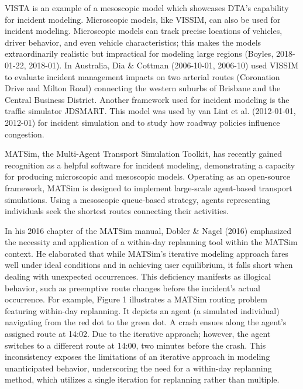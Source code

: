 \documentclass[fancy, oneside, mastersfancy, ms]{byuthesis}
\begin{document}
VISTA is an example of a mesoscopic model which showcases DTA's
capability for incident modeling. Microscopic models, like VISSIM, can
also be used for incident modeling. Microscopic models can track precise
locations of vehicles, driver behavior, and even vehicle
characteristics; this makes the models extraordinarily realistic but
impractical for modeling large regions (Boyles, 2018-01-22, 2018-01). In
Australia, Dia \& Cottman (2006-10-01, 2006-10) used VISSIM to evaluate
incident management impacts on two arterial routes (Coronation Drive and
Milton Road) connecting the western suburbs of Brisbane and the Central
Business District. Another framework used for incident modeling is the
traffic simulator JDSMART. This model was used by van Lint et al.
(2012-01-01, 2012-01) for incident simulation and to study how roadway
policies influence congestion.

MATSim, the Multi-Agent Transport Simulation Toolkit, has recently
gained recognition as a helpful software for incident modeling,
demonstrating a capacity for producing microscopic and mesoscopic
models. Operating as an open-source framework, MATSim is designed to
implement large-scale agent-based transport simulations. Using a
mesoscopic queue-based strategy, agents representing individuals seek
the shortest routes connecting their activities.

In his 2016 chapter of the MATSim manual, Dobler \& Nagel (2016)
emphasized the necessity and application of a within-day replanning tool
within the MATSim context. He elaborated that while MATSim's iterative
modeling approach fares well under ideal conditions and in achieving
user equilibrium, it falls short when dealing with unexpected
occurrences. This deficiency manifests as illogical behavior, such as
preemptive route changes before the incident's actual occurrence. For
example, Figure 1 illustrates a MATSim routing problem featuring
within-day replanning. It depicts an agent (a simulated individual)
navigating from the red dot to the green dot. A crash ensues along the
agent's assigned route at 14:02. Due to the iterative approach; however,
the agent switches to a different route at 14:00, two minutes before the
crash. This inconsistency exposes the limitations of an iterative
approach in modeling unanticipated behavior, underscoring the need for a
within-day replanning method, which utilizes a single iteration for
replanning rather than multiple.
\end{document}
